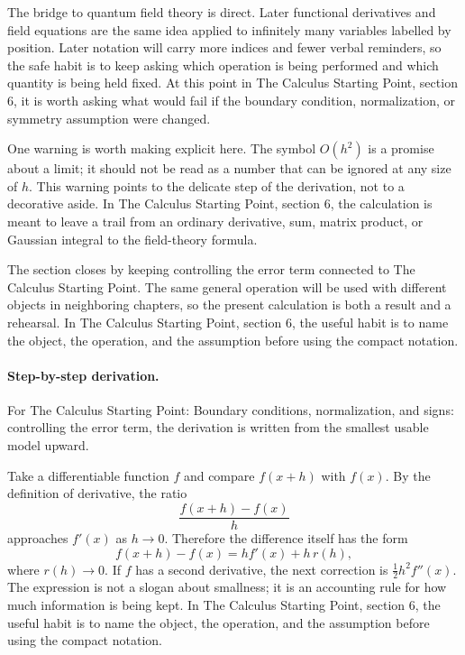 The bridge to quantum field theory is direct.  Later functional derivatives and field equations are the same idea applied to infinitely many variables labelled by position.  Later notation will carry more indices and fewer verbal reminders, so the safe habit is to keep asking which operation is being performed and which quantity is being held fixed.  At this point in The Calculus Starting Point, section 6, it is worth asking what would fail if the boundary condition, normalization, or symmetry assumption were changed.

One warning is worth making explicit here.  The symbol \(O(h^2)\) is a promise about a limit; it should not be read as a number that can be ignored at any size of \(h\).  This warning points to the delicate step of the derivation, not to a decorative aside.  In The Calculus Starting Point, section 6, the calculation is meant to leave a trail from an ordinary derivative, sum, matrix product, or Gaussian integral to the field-theory formula.

The section closes by keeping controlling the error term connected to The Calculus Starting Point.  The same general operation will be used with different objects in neighboring chapters, so the present calculation is both a result and a rehearsal.  In The Calculus Starting Point, section 6, the useful habit is to name the object, the operation, and the assumption before using the compact notation.



\paragraph{Step-by-step derivation.}

For The Calculus Starting Point: Boundary conditions, normalization, and signs: controlling the error term, the derivation is written from the smallest usable model upward.

Take a differentiable function \(f\) and compare \(f(x+h)\) with \(f(x)\).  By the definition of derivative, the ratio
\[
  \frac{f(x+h)-f(x)}{h}
\]
approaches \(f'(x)\) as \(h\to0\).  Therefore the difference itself has the form
\[
  f(x+h)-f(x)=hf'(x)+h\,r(h),
\]
where \(r(h)\to0\).  If \(f\) has a second derivative, the next correction is \(\frac12h^2f''(x)\).  The expression is not a slogan about smallness; it is an accounting rule for how much information is being kept.  In The Calculus Starting Point, section 6, the useful habit is to name the object, the operation, and the assumption before using the compact notation.

